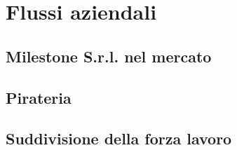 
\chapter{Flussi aziendali}
\label{cap:flussi-aziendali}

\section{Milestone S.r.l. nel mercato}

\section{Pirateria}

\section{Suddivisione della forza lavoro}
